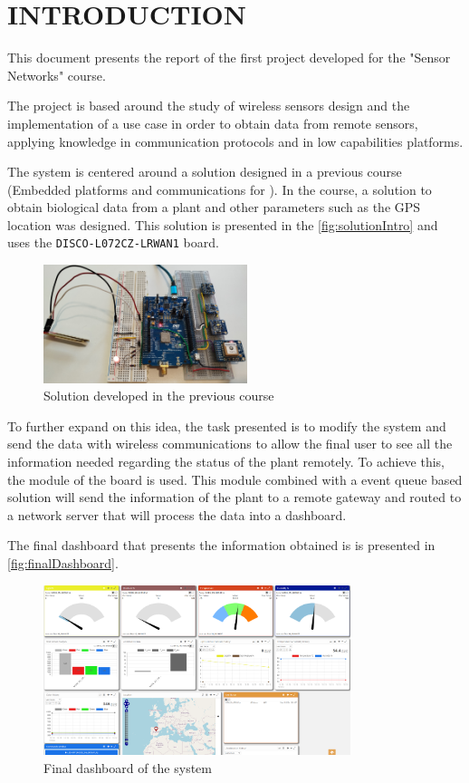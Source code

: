 \section{INTRODUCTION}

This document presents the report of the first project developed for the "Sensor Networks" course.

The project is based around the study of wireless sensors design and the implementation of a use case in order to obtain data from remote sensors, applying knowledge in communication protocols and in low capabilities platforms.

The system is centered around a solution designed in a previous course (Embedded platforms and communications for ). In the course, a solution to obtain biological data from a plant and other parameters such as the 
GPS location was designed. This solution is presented in the \autoref{fig:solutionIntro} and uses the \texttt{DISCO-L072CZ-LRWAN1} board.
\begin{figure}[H]
    \centering
    \includegraphics[width=0.53\textwidth]{images/1/sistema.png}
    \caption{Solution developed in the previous course}
    \label{fig:solutionIntro}
\end{figure}

To further expand on this idea, the task presented is to modify the system and send the data with wireless communications to allow the final user to see all the information needed regarding the status of the plant 
remotely. To achieve this, the  module of the board is used. This module combined with a event queue based solution will send the information of the plant to 
a remote gateway and routed to a network server that will process the data into a dashboard.

The final dashboard that presents the information obtained is is presented in \autoref{fig:finalDashboard}.
\begin{figure}[H]
    \centering
    \includegraphics[width=0.8\textwidth]{images/1/FinalDashboard.png}
    \caption{Final dashboard of the system}
    \label{fig:finalDashboard}
\end{figure}